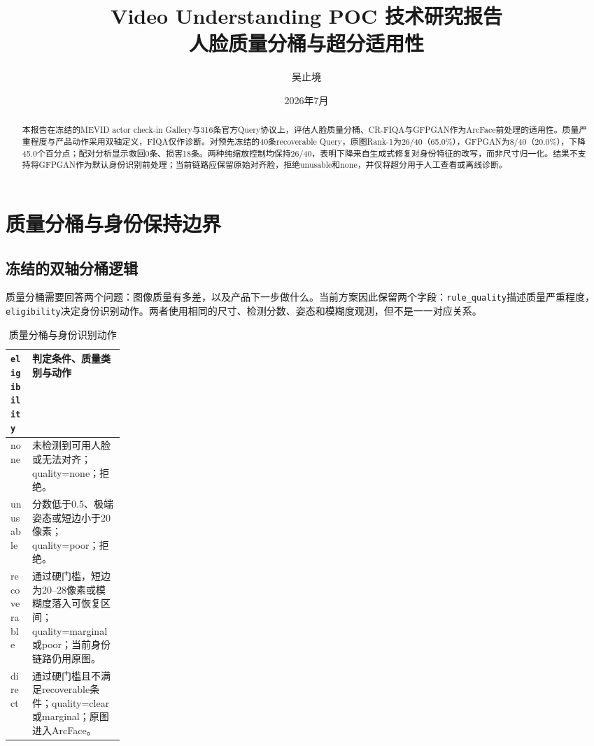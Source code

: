 \documentclass[UTF8,a4paper,10pt]{ctexart}
\title{\textbf{Video Understanding POC 技术研究报告}\\[-0.15em]
\large 人脸质量分桶与超分适用性}
\author{吴止境}
\date{2026年7月}
\begin{document}
\pagestyle{plain}
\maketitle

\begin{abstract}
本报告在冻结的MEVID actor check-in Gallery与316条官方Query协议上，评估人脸质量分桶、CR-FIQA与GFPGAN作为ArcFace前处理的适用性。质量严重程度与产品动作采用双轴定义，FIQA仅作诊断。对预先冻结的40条recoverable Query，原图Rank-1为26/40（65.0\%），GFPGAN为8/40（20.0\%），下降45.0个百分点；配对分析显示救回0条、损害18条。两种纯缩放控制均保持26/40，表明下降来自生成式修复对身份特征的改写，而非尺寸归一化。结果不支持将GFPGAN作为默认身份识别前处理；当前链路应保留原始对齐脸，拒绝unusable和none，并仅将超分用于人工查看或离线诊断。
\end{abstract}

\section{质量分桶与身份保持边界}

\subsection{冻结的双轴分桶逻辑}

质量分桶需要回答两个问题：图像质量有多差，以及产品下一步做什么。当前方案因此保留两个字段：\texttt{rule\_quality}描述质量严重程度，\texttt{eligibility}决定身份识别动作。两者使用相同的尺寸、检测分数、姿态和模糊度观测，但不是一一对应关系。

\begin{table}[!htbp]
\centering
\caption{质量分桶与身份识别动作}
\label{tab:quality-routing}
\small
\begin{tabularx}{\linewidth}{
  >{\raggedright\arraybackslash}p{0.19\linewidth}
  >{\raggedright\arraybackslash}X}
\toprule
\texttt{eligibility} & 判定条件、质量类别与动作\\
\midrule
none & 未检测到可用人脸或无法对齐；quality=none；拒绝。\\
unusable & 分数低于0.5、极端姿态或短边小于20像素；quality=poor；拒绝。\\
recoverable & 通过硬门槛，短边为20--28像素或模糊度落入可恢复区间；quality=marginal或poor；当前身份链路仍用原图。\\
direct & 通过硬门槛且不满足recoverable条件；quality=clear或marginal；原图进入ArcFace。\\
\bottomrule
\end{tabularx}
\end{table}
\end{document}
